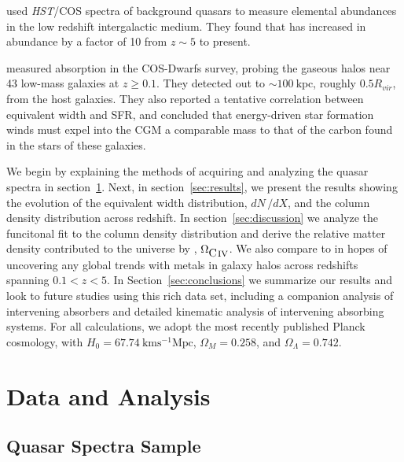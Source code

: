 \documentclass[linenumbers,twocolumn]{aastex61}
\begin{document}
\cite{Shull2014} used {\it HST}/COS spectra of background quasars to measure elemental abundances in the low redshift intergalactic medium. They found that {\CIV} has increased in abundance by a factor of 10 from $z \sim 5$ to present.

\cite{Bordoloi2014} measured {\CIV} absorption in the COS-Dwarfs survey, probing the gaseous halos near 43 low-mass galaxies at $z \ge 0.1$. They detected {\CIV} out to $\sim 100~\mathrm{kpc}$, roughly $0.5 R_{vir}$, from the host galaxies. They also reported a tentative correlation between {\CIV} equivalent width and SFR, and concluded that energy-driven star formation winds must expel into the CGM a comparable mass to that of the carbon found in the stars of these galaxies.

We begin by explaining the methods of acquiring and analyzing the quasar spectra in section~\ref{sec:data}. Next, in section~\ref{sec:results}, we present the results showing the evolution of the {\CIV} equivalent width distribution, $dN\,/dX$, and the {\CIV} column density distribution across redshift. In section~\ref{sec:discussion} we analyze the funcitonal fit to the column density distribution and derive the relative matter density contributed to the universe by {\CIV}, $\Omega_{\hbox{{\rm C}\kern 0.1em{\sc iv}}}$. We also compare {\CIV} to {\MgII} in hopes of uncovering any global trends with metals in galaxy halos across redshifts spanning $0.1 < z < 5$. In Section~\ref{sec:conclusions} we summarize our results and look to future studies using this rich data set, including a companion analysis of intervening {\CIV} absorbers and detailed kinematic analysis of intervening absorbing systems. For all calculations, we adopt the most recently published Planck cosmology, with $H_0 = 67.74~\mathrm{km s^{-1} Mpc}$, $\Omega_M = 0.258$, and $\Omega_{\Lambda} = 0.742$.


\section{Data and Analysis}
\label{sec:data}

\subsection{Quasar Spectra Sample}
\label{sec:sample}
\end{document}
